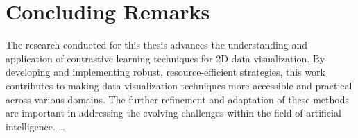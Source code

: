 \section{Concluding Remarks}

The research conducted for this thesis advances the understanding and application of contrastive learning techniques for 2D data visualization. By developing and implementing robust, resource-efficient strategies, this work contributes to making data visualization techniques more accessible and practical across various domains. The further refinement and adaptation of these methods are important in addressing the evolving challenges within the field of artificial intelligence.
\ldots